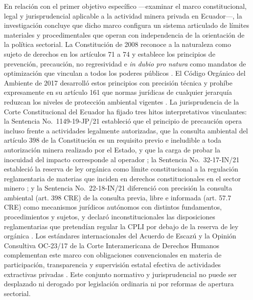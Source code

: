 En relación con el primer objetivo específico —examinar el marco constitucional, legal y jurisprudencial aplicable a la actividad minera privada en Ecuador—, la investigación concluye que dicho marco configura un sistema articulado de límites materiales y procedimentales que operan con independencia de la orientación de la política sectorial. La Constitución de 2008 reconoce a la naturaleza como sujeto de derechos en los artículos 71 a 74 y establece los principios de prevención, precaución, no regresividad e \textit{in dubio pro natura} como mandatos de optimización que vinculan a todos los poderes públicos \parencite{cre_2008}. El Código Orgánico del Ambiente de 2017 desarrolló estos principios con precisión técnica y prohíbe expresamente en su artículo 161 que normas jurídicas de cualquier jerarquía reduzcan los niveles de protección ambiental vigentes \parencite{coa_2017}. La jurisprudencia de la Corte Constitucional del Ecuador ha fijado tres hitos interpretativos vinculantes: la Sentencia No.\ 1149-19-JP/21 estableció que el principio de precaución opera incluso frente a actividades legalmente autorizadas, que la consulta ambiental del artículo 398 de la Constitución es un requisito previo e ineludible a toda autorización minera realizado por el Estado, y que la carga de probar la inocuidad del impacto corresponde al operador \parencite{cce_1149_19_jp_21}; la Sentencia No.\ 32-17-IN/21 estableció la reserva de ley orgánica como límite constitucional a la regulación reglamentaria de materias que inciden en derechos constitucionales en el sector minero \parencite{cce_32_17_in_21}; y la Sentencia No.\ 22-18-IN/21 diferenció con precisión la consulta ambiental (art. 398 CRE) de la consulta previa, libre e informada (art. 57.7 CRE) como mecanismos jurídicos autónomos con distintos fundamentos, procedimientos y sujetos, y declaró inconstitucionales las disposiciones reglamentarias que pretendían regular la CPLI por debajo de la reserva de ley orgánica \parencite{cce_22_18_in_21}. Los estándares internacionales del Acuerdo de Escazú y la Opinión Consultiva OC-23/17 de la Corte Interamericana de Derechos Humanos complementan este marco con obligaciones convencionales en materia de participación, transparencia y supervisión estatal efectiva de actividades extractivas privadas \parencite{acuerdo_escazu_2018,corte_idh_oc23_2017}. Este conjunto normativo y jurisprudencial no puede ser desplazado ni derogado por legislación ordinaria ni por reformas de apertura sectorial.


